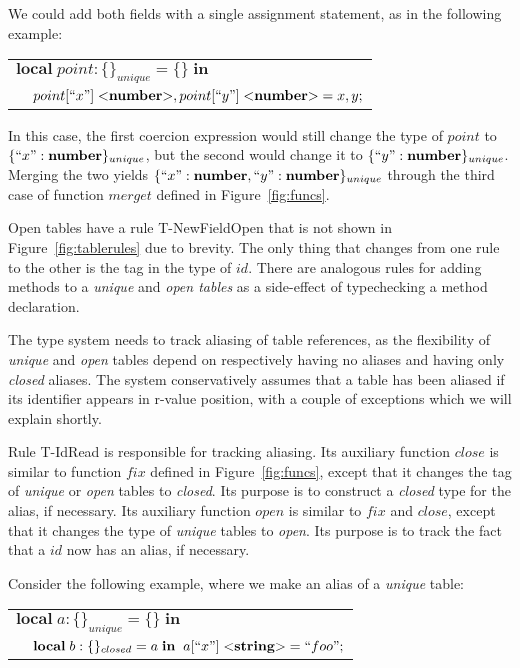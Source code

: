 \documentclass[preprint]{sigplanconf}
\newcommand{\Number}{\mathbf{number}}
\newcommand{\String}{\mathbf{string}}
\begin{document}
We could add both fields with a single assignment statement,
as in the following example:
\begin{center}
	\begin{tabular}{ll}
		\multicolumn{2}{l}{$\mathbf{local} \; point: \{\}_{unique} = \{\} \; \mathbf{in}$}\\
		& \multicolumn{1}{l}{$point[``x"] \; {<}\Number{>},point[``y"] \; {<}\Number{>} = x,y;$}
	\end{tabular}
\end{center}

In this case, the first coercion expression would still change the type of $point$ to $\{``x":\Number\}_{unique}$, but the
second would change it to $\{``y":\Number\}_{unique}$.
Merging the two yields $\{``x":\Number, ``y": \Number\}_{unique}$
through the third case of function $merget$ defined in Figure~\ref{fig:funcs}.

Open tables have a rule {\sc T-NewFieldOpen} that is not shown
in Figure~\ref{fig:tablerules} due to brevity. The only thing that
changes from one rule to the other is the tag in the type of $id$.
There are analogous rules for adding methods to a {\em unique}
and {\em open tables} as a side-effect of typechecking a method declaration.

The type system needs to track aliasing of table references,
as the flexibility of {\em unique} and {\em open} tables
depend on respectively having no aliases and having only {\em closed} aliases. The system conservatively assumes that
a table has been aliased if its identifier appears in r-value position, with a couple of exceptions which we will explain shortly.

Rule {\sc T-IdRead} is responsible for tracking
aliasing. Its auxiliary function $close$ is similar to
function $fix$ defined in Figure~\ref{fig:funcs},
except that it changes the tag of {\em unique} or
{\em open} tables to {\em closed}. Its purpose
is to construct a {\em closed} type for the alias,
if necessary. Its auxiliary function $open$ is similar
to $fix$ and $close$, except that it changes the type of
{\em unique} tables to {\em open}. Its purpose
is to track the fact that a $id$ now has an alias,
if necessary.
 
Consider the following example, where we make an alias
of a {\em unique} table:
\begin{center}
\begin{tabular}{lll}
\multicolumn{3}{l}{$\mathbf{local} \; a:\{\}_{unique} = \{\} \; \mathbf{in}$}\\
& \multicolumn{2}{l}{$\mathbf{local} \; b:\{\}_{closed} = a \; \mathbf{in}\;\;a[``x"] \; {<}\String{>} = ``foo";$}
\end{tabular}
\end{center}
\end{document}
